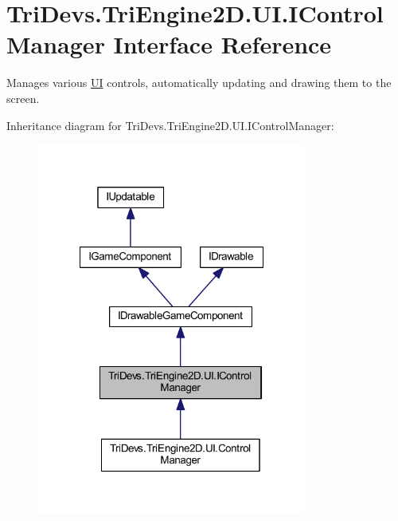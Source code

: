 \hypertarget{interface_tri_devs_1_1_tri_engine2_d_1_1_u_i_1_1_i_control_manager}{\section{Tri\-Devs.\-Tri\-Engine2\-D.\-U\-I.\-I\-Control\-Manager Interface Reference}
\label{interface_tri_devs_1_1_tri_engine2_d_1_1_u_i_1_1_i_control_manager}
}


Manages various \hyperlink{namespace_tri_devs_1_1_tri_engine2_d_1_1_u_i}{U\-I} controls, automatically updating and drawing them to the screen.  




Inheritance diagram for Tri\-Devs.\-Tri\-Engine2\-D.\-U\-I.\-I\-Control\-Manager\-:
\nopagebreak
\begin{figure}[H]
\begin{center}
\leavevmode
\includegraphics[width=251pt]{interface_tri_devs_1_1_tri_engine2_d_1_1_u_i_1_1_i_control_manager__inherit__graph}
\end{center}
\end{figure}


